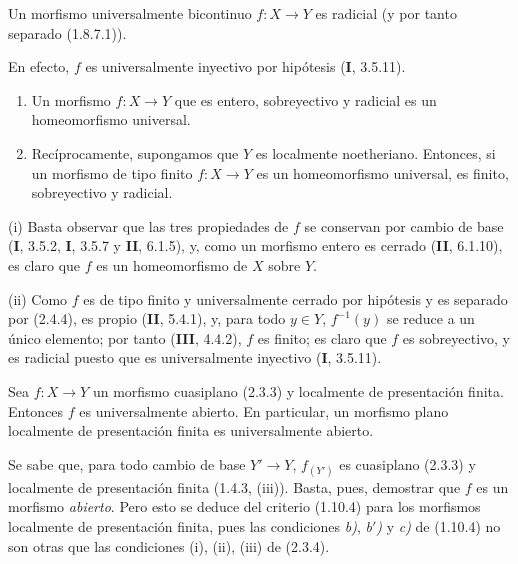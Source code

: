 \begin{proposition}[2.4.4]
\label{IV.2.4.4-fr}
Un morfismo universalmente bicontinuo $f:X\to Y$ es radicial (y por tanto
separado \textup{(1.8.7.1)}).
\end{proposition}

En efecto, $f$ es universalmente inyectivo por hipótesis (\textbf I, 3.5.11).

\begin{proposition}[2.4.5]
\begin{enumerate}
\item[\textup{(i)}] Un morfismo $f:X\to Y$ que es entero, sobreyectivo y radicial es un
homeomorfismo universal.
\item[\textup{(ii)}] Recíprocamente, supongamos que $Y$ es localmente noetheriano.
Entonces, si un morfismo de tipo finito $f:X\to Y$ es un homeomorfismo
universal, es finito, sobreyectivo y radicial.
\end{enumerate}
\end{proposition}

(i) Basta observar que las tres propiedades de $f$ se conservan por cambio de
base (\textbf I, 3.5.2, \textbf{I}, 3.5.7 y \textbf{II}, 6.1.5), y, como un morfismo entero es cerrado
(\textbf{II}, 6.1.10), es claro que $f$ es un homeomorfismo de $X$ sobre $Y$.

(ii) Como $f$ es de tipo finito y universalmente cerrado por hipótesis y es
separado por (2.4.4), es propio (\textbf{II}, 5.4.1), y, para todo $y\in Y$,
$f^{-1}(y)$ se reduce a un único elemento; por tanto (\textbf{III}, 4.4.2), $f$ es
finito; es claro que $f$ es sobreyectivo, y es radicial puesto que es
universalmente inyectivo (\textbf I, 3.5.11).

\begin{theorem}[2.4.6]
\label{IV.2.4.6-fr}
Sea $f:X\to Y$ un morfismo cuasiplano \textup{(2.3.3)} y localmente de presentación
finita. Entonces $f$ es universalmente abierto. En particular, un morfismo
plano localmente de presentación finita es universalmente abierto.
\end{theorem}

Se sabe que, para todo cambio de base $Y'\to Y$, $f_{(Y')}$ es cuasiplano
(2.3.3) y localmente de presentación finita (1.4.3, (iii)). Basta, pues,
demostrar que $f$ es un
morfismo \emph{abierto}. Pero esto se deduce del criterio (1.10.4) para los morfismos
localmente de presentación finita, pues las condiciones \emph{b)},
\emph{b$'$)} y \emph{c)} de (1.10.4) no son otras que las condiciones (i),
(ii), (iii) de (2.3.4).

